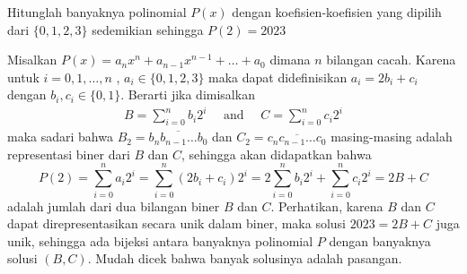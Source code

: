 \documentclass[11pt]{scrartcl}
\begin{document}
\begin{soaljawab}
    Hitunglah banyaknya polinomial $P(x)$ dengan koefisien-koefisien yang dipilih dari $\{0, 1, 2, 3\}$ sedemikian sehingga $P(2) = 2023$
    \begin{solusi}
    Misalkan $P(x)=a_nx^n+a_{n-1}x^{n-1} + \dots + a_0$ dimana $n$ bilangan cacah. Karena untuk $i=0,1,\dots,n$ , $a_i \in \{0,1,2,3\}$ maka dapat didefinisikan $a_i = 2b_i+c_i$ dengan $b_i,c_i \in \{0,1\}$. Berarti jika dimisalkan
    \begin{align*}
        B = \sum_{i = 0}^{n}b_i2^{i} \quad \text{ and } \quad C = \sum_{i = 0}^{n} c_i2^{i}
    \end{align*}
    maka sadari bahwa $B_2 = \overline{b_nb_{n-1}\ldots b_0}$ dan $C_2 = \overline{c_nc_{n-1} \ldots c_0}$ masing-masing adalah representasi biner dari $B$ dan $C$, sehingga akan didapatkan bahwa
    $$P(2) = \sum_{i = 0}^{n} a_i2^i = \sum_{i = 0}^{n} (2b_i+c_i)2^i = 2\sum_{i = 0}^{n}b_i2^i + \sum_{i = 0}^{n} c_i2^i = 2B+C$$
    adalah jumlah dari dua bilangan biner $B$ dan $C$. Perhatikan, karena $B$ dan $C$ dapat direpresentasikan secara unik dalam biner, maka solusi $2023 = 2B+C$ juga unik, sehingga ada bijeksi antara banyaknya polinomial $P$ dengan banyaknya solusi $(B,C)$. Mudah dicek bahwa banyak solusinya adalah  pasangan.
    \end{solusi}
\end{soaljawab}
\end{document}
